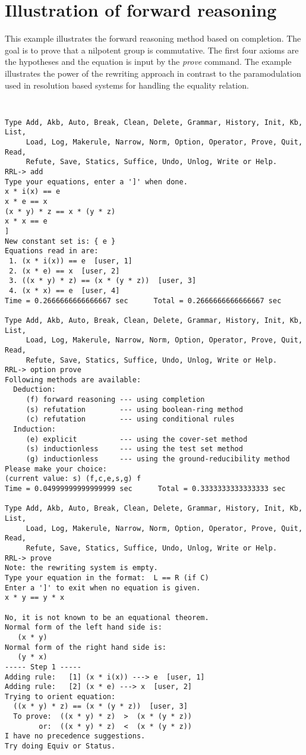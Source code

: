 \chapter{Illustration of forward reasoning}
\normalsize
\rm
This example illustrates the forward reasoning method based on completion.
The goal is to prove that a nilpotent group is commutative. The first four
axioms are the hypotheses and the equation is input by the {\em prove}
command. 
The example illustrates the power of the rewriting approach in
contrast to the paramodulation used in resolution based systems for
handling the equality relation.

\small
\tt
\begin{verbatim}
Type Add, Akb, Auto, Break, Clean, Delete, Grammar, History, Init, Kb, List,
     Load, Log, Makerule, Narrow, Norm, Option, Operator, Prove, Quit, Read,
     Refute, Save, Statics, Suffice, Undo, Unlog, Write or Help.
RRL-> add
Type your equations, enter a ']' when done.
x * i(x) == e
x * e == x
(x * y) * z == x * (y * z)
x * x == e
]
New constant set is: { e }
Equations read in are:
 1. (x * i(x)) == e  [user, 1]
 2. (x * e) == x  [user, 2]
 3. ((x * y) * z) == (x * (y * z))  [user, 3]
 4. (x * x) == e  [user, 4]
Time = 0.2666666666666667 sec      Total = 0.2666666666666667 sec

Type Add, Akb, Auto, Break, Clean, Delete, Grammar, History, Init, Kb, List,
     Load, Log, Makerule, Narrow, Norm, Option, Operator, Prove, Quit, Read,
     Refute, Save, Statics, Suffice, Undo, Unlog, Write or Help.
RRL-> option prove
Following methods are available:
  Deduction:
     (f) forward reasoning --- using completion
     (s) refutation        --- using boolean-ring method
     (c) refutation        --- using conditional rules
  Induction:
     (e) explicit          --- using the cover-set method
     (s) inductionless     --- using the test set method
     (g) inductionless     --- using the ground-reducibility method
Please make your choice: 
(current value: s) (f,c,e,s,g) f
Time = 0.04999999999999999 sec      Total = 0.3333333333333333 sec

Type Add, Akb, Auto, Break, Clean, Delete, Grammar, History, Init, Kb, List,
     Load, Log, Makerule, Narrow, Norm, Option, Operator, Prove, Quit, Read,
     Refute, Save, Statics, Suffice, Undo, Unlog, Write or Help.
RRL-> prove
Note: the rewriting system is empty.
Type your equation in the format:  L == R (if C) 
Enter a ']' to exit when no equation is given.
x * y == y * x

No, it is not known to be an equational theorem.
Normal form of the left hand side is:
   (x * y)
Normal form of the right hand side is:
   (y * x)
----- Step 1 -----
Adding rule:   [1] (x * i(x)) ---> e  [user, 1]
Adding rule:   [2] (x * e) ---> x  [user, 2]
Trying to orient equation: 
  ((x * y) * z) == (x * (y * z))  [user, 3]
  To prove:  ((x * y) * z)  >  (x * (y * z))
        or:  ((x * y) * z)  <  (x * (y * z))
I have no precedence suggestions.  
Try doing Equiv or Status.


\end{verbatim}
